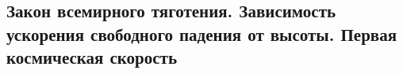 \subsection{Закон всемирного тяготения. Зависимость ускорения свободного падения от высоты. Первая космическая скорость}